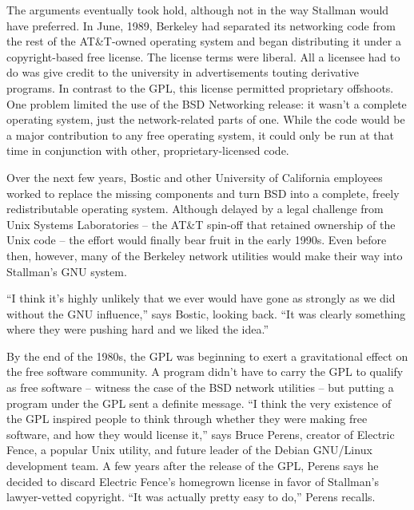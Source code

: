 The arguments eventually took hold, although not in the way Stallman would have preferred. In June, 1989, Berkeley had separated its networking code from the rest of the AT\&T-owned operating system and began distributing it under a copyright-based free license. The license terms were liberal. All a licensee had to do was give credit to the university in advertisements touting derivative programs. In contrast to the GPL, this license permitted proprietary offshoots.  One problem limited the use of the BSD Networking release: it wasn't a complete operating system, just the network-related parts of one.  While the code would be a major contribution to any free operating system, it could only be run at that time in conjunction with other, proprietary-licensed code.

Over the next few years, Bostic and other University of California employees worked to replace the missing components and turn BSD into a complete, freely redistributable operating system. Although delayed by a legal challenge from Unix Systems Laboratories -- the AT\&T spin-off that retained ownership of the Unix code -- the effort would finally bear fruit in the early 1990s. Even before then, however, many of the Berkeley network utilities would make their way into Stallman's GNU system.

``I think it's highly unlikely that we ever would have gone as strongly as we did without the GNU influence,'' says Bostic, looking back. ``It was clearly something where they were pushing hard and we liked the idea.''

By the end of the 1980s, the GPL was beginning to exert a gravitational effect on the free software community. A program didn't have to carry the GPL to qualify as free software -- witness the case of the BSD network utilities -- but putting a program under the GPL sent a definite message. ``I think the very existence of the GPL inspired people to think through whether they were making free software, and how they would license it,'' says Bruce Perens, creator of Electric Fence, a popular Unix utility, and future leader of the Debian GNU/Linux development team. A few years after the release of the GPL, Perens says he decided to discard Electric Fence's homegrown license in favor of Stallman's lawyer-vetted copyright. ``It was actually pretty easy to do,'' Perens recalls.

